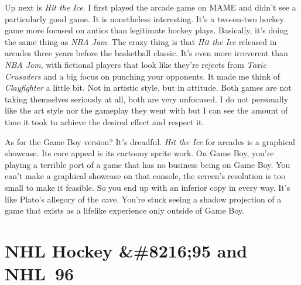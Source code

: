 \documentclass{book}
\let\oldcenter\center
\let\oldendcenter\endcenter
\renewenvironment{center}{\setlength\topsep{0pt}\oldcenter}{\oldendcenter}
\begin{document}
\begin{center}
\vspace{8pt}
\quad\vspace{4pt}
\end{center}

Up next is \emph{Hit the Ice}. I first played the arcade game on MAME and didn’t see a particularly good game. It is nonetheless interesting. It’s a two-on-two hockey game more focused on antics than legitimate hockey plays. Basically, it’s doing the same thing as \emph{NBA Jam}. The crazy thing is that \emph{Hit the Ice} released in arcades three years before the basketball classic. It’s even more irreverent than \emph{NBA Jam}, with fictional players that look like they’re rejects from \emph{Toxic Crusaders} and a big focus on punching your opponents. It made me think of \emph{Clayfighter} a little bit. Not in artistic style, but in attitude. Both games are not taking themselves seriously at all, both are very unfocused. I do not personally like the art style nor the gameplay they went with but I can see the amount of time it took to achieve the desired effect and respect it.

As for the Game Boy version? It’s dreadful. \emph{Hit the Ice} for arcades is a graphical showcase. Its core appeal is its cartoony sprite work. On Game Boy, you’re playing a terrible port of a game that has no business being on Game Boy. You can’t make a graphical showcase on that console, the screen’s resolution is too small to make it feasible. So you end up with an inferior copy in every way. It’s like Plato’s allegory of the cave. You’re stuck seeing a shadow projection of a game that exists as a lifelike experience only outside of Game Boy.

\FloatBarrier\needspace{10mm}\section*{NHL Hockey &\#8216;95 and NHL 96}\nopagebreak[4]

\begin{center}
\vspace{8pt}
\quad\vspace{4pt}
\quad\vspace{4pt}
\quad\vspace{4pt}
\end{center}
\end{document}
